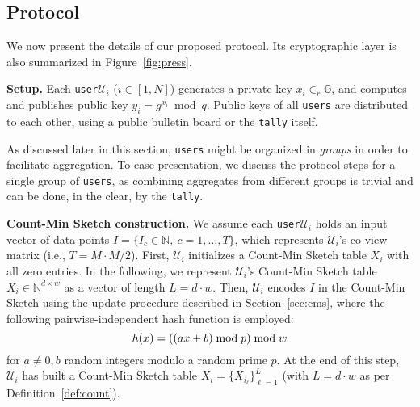 \documentclass[conference]{IEEEtran}
\newcommand{\descr}[1]{\medskip \noindent \textbf{#1}}
\newcommand{\Ui}{\mathcal{U}_i}
\newcommand{\user}{{\tt user}\xspace}
\newcommand{\users}{{\tt users}\xspace}
\newcommand{\tally}{{\tt tally}\xspace}
\begin{document}
\subsection{Protocol}
\label{sec:prot}

We now present the details of our proposed protocol. Its cryptographic layer is also summarized in Figure~\ref{fig:press}. 

\descr{Setup.} Each \user $\Ui$ ($i\in[1,N]$) generates a private key $x_i \in_r \mathbb{G}$, and computes and publishes public key $y_i = g^{x_i} \bmod q$. Public keys of all \users are distributed to each other, using a public bulletin board or the \tally itself.

As discussed later in this section, \users might be organized in {\em groups} in order to facilitate aggregation. To ease presentation, we discuss the protocol steps for a single group of \users, as combining aggregates from different groups is trivial and can be done, in the clear, by the \tally.
 


\descr{Count-Min Sketch construction.} We assume each \user $\Ui$ holds an input vector of data points $I = \lbrace{ I_c \in \mathbb{N},\: c=1,\dots,T \rbrace}$, which represents $\Ui$'s co-view matrix (i.e., $T=M\cdot M/2$). First, $\Ui$ initializes a Count-Min Sketch table $X_i$ with all zero entries. In the following, we represent $\Ui$'s Count-Min Sketch table $X_i \in \mathbb{N}^{d \times w}$ as a vector of length $L=d \cdot w$. Then, $\Ui$ encodes $I$ in the Count-Min Sketch using the update procedure described in Section~\ref{sec:cms}, where the following pairwise-independent hash function is employed:\vspace{-0.05cm} 
\[
h(x) = ((ax + b)\bmod p)\bmod w \vspace{-0.05cm}
\]
for $a\neq 0,b$ random integers modulo a random prime $p$. 
At the end of this step, $\Ui$ has built a Count-Min Sketch table $X_i=\{X_{i_\ell}\}_{\ell=1}^L$ (with $L=d\cdot w$ as per Definition~\ref{def:count}).
\end{document}
